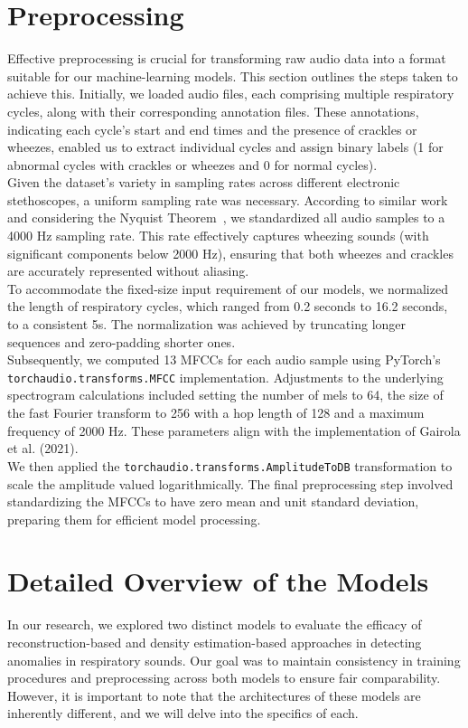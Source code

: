\section{Preprocessing}
\label{method:preprocessing}
Effective preprocessing is crucial for transforming raw audio data into a format suitable for our machine-learning models. This section outlines the steps taken to achieve this.
Initially, we loaded audio files, each comprising multiple respiratory cycles, along with their corresponding annotation files. These annotations, indicating each cycle's start and end times and the presence of crackles or wheezes, enabled us to extract individual cycles and assign binary labels (1 for abnormal cycles with crackles or wheezes and 0 for normal cycles).\\
Given the dataset's variety in sampling rates across different electronic stethoscopes, a uniform sampling rate was necessary. According to similar work~\cite{cozzatti2022variational,serbes2018automated} and considering the Nyquist Theorem~\cite{por2019nyquist}, we standardized all audio samples to a 4000 Hz sampling rate. This rate effectively captures wheezing sounds (with significant components below 2000 Hz), ensuring that both wheezes and crackles are accurately represented without aliasing.\\
To accommodate the fixed-size input requirement of our models, we normalized the length of respiratory cycles, which ranged from 0.2 seconds to 16.2 seconds, to a consistent 5s. The normalization was achieved by truncating longer sequences and zero-padding shorter ones.\\
Subsequently, we computed 13 MFCCs for each audio sample using PyTorch's~\cite{paszke2019pytorch} \lstinline{torchaudio.transforms.MFCC} implementation. Adjustments to the underlying spectrogram calculations included setting the number of mels to 64, the size of the fast Fourier transform to 256 with a hop length of 128 and a maximum frequency of 2000 Hz. These parameters align with the implementation of Gairola et al. (2021).\\
We then applied the \lstinline{torchaudio.transforms.AmplitudeToDB} transformation to scale the amplitude valued logarithmically. The final preprocessing step involved standardizing the MFCCs to have zero mean and unit standard deviation, preparing them for efficient model processing.


\section{Detailed Overview of the Models}
In our research, we explored two distinct models to evaluate the efficacy of reconstruction-based and density estimation-based approaches in detecting anomalies in respiratory sounds. Our goal was to maintain consistency in training procedures and preprocessing across both models to ensure fair comparability. However, it is important to note that the architectures of these models are inherently different, and we will delve into the specifics of each.

